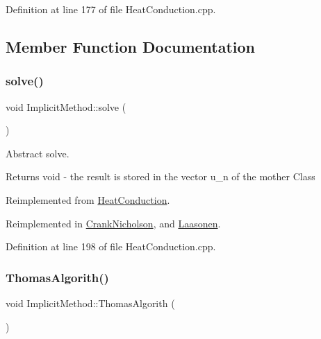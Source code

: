 Definition at line 177 of file Heat\+Conduction.\+cpp.



\subsection{Member Function Documentation}
\mbox{\label{class_implicit_method_ae06909ac3cde1ae9fb216501c852e22c}} 
\subsubsection{\texorpdfstring{solve()}{solve()}}
{\footnotesize\ttfamily void Implicit\+Method\+::solve (\begin{DoxyParamCaption}{ }\end{DoxyParamCaption})\hspace{0.3cm}{\ttfamily [virtual]}}



Abstract solve. 

\begin{DoxyReturn}{Returns}
void -\/ the result is stored in the vector u\+\_\+n of the mother Class 
\end{DoxyReturn}


Reimplemented from \hyperlink{class_heat_conduction_ac176ea1a94c2fdb0da017b987ea22d1c}{Heat\+Conduction}.



Reimplemented in \hyperlink{class_crank_nicholson_a2846912cccce367888c37bf0e58f1cb1}{Crank\+Nicholson}, and \hyperlink{class_laasonen_a53cf5a72691175df0b3b6bdcbfee8c9b}{Laasonen}.



Definition at line 198 of file Heat\+Conduction.\+cpp.

\mbox{\label{class_implicit_method_ae06f9aa9d076738cdcb7cd967d453795}} 
\subsubsection{\texorpdfstring{Thomas\+Algorith()}{ThomasAlgorith()}}
{\footnotesize\ttfamily void Implicit\+Method\+::\+Thomas\+Algorith (\begin{DoxyParamCaption}{ }\end{DoxyParamCaption})}



